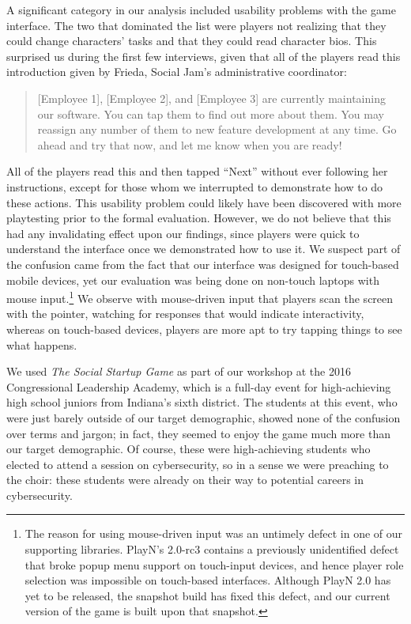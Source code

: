 \documentclass[letterpaper]{article}
\begin{document}
A significant category in our analysis included usability problems
with the game interface.
The two that dominated the list were players not realizing that they
could change characters' tasks and that they could
read character bios. This surprised us during the first few interviews,
given that all of the players read this introduction given by Frieda,
Social Jam's administrative coordinator:
\begin{quote} 
  [Employee 1], [Employee 2], and [Employee 3] are currently maintaining our
  software. You can tap them to find out more about them. You may
  reassign any number of them to new feature development at any
  time. Go ahead and try that now, and let me know when you are ready!
\end{quote}
All of the players read this and then tapped ``Next'' without ever following her
instructions, except for those whom we interrupted to demonstrate
how to do these actions.
This usability problem could likely have been discovered with 
more playtesting prior to the formal evaluation. However, we do not
believe that this had any invalidating effect upon our findings,
since players were quick to understand the interface once we
demonstrated how to use it. We suspect part of the confusion came from
the fact that our interface was designed for touch-based mobile devices,
yet our evaluation was being done on non-touch laptops with mouse
input.\footnote{The reason for using mouse-driven input was
 an untimely defect in one of our supporting libraries. 
PlayN's 2.0-rc3 contains a previously unidentified defect 
that broke popup menu support on touch-input devices, and hence player role
selection was impossible on touch-based interfaces. Although PlayN
2.0 has yet to be released, the snapshot build has fixed this defect,
and our current version of the game is built upon that snapshot.}
We observe with mouse-driven input that players scan the screen
with the pointer, watching for responses that would indicate 
interactivity, whereas on touch-based devices, players are more
apt to try tapping things to see what happens.

We used \textit{The Social Startup Game} as part of our workshop 
at the 2016 Congressional Leadership Academy, which is a full-day event
for high-achieving high school juniors from Indiana's sixth district.
The students at this event, who were just barely outside of our
target demographic, showed none of the confusion over terms
and jargon; in fact, they seemed to enjoy the game much more than our
target demographic. 
Of course, these were high-achieving students who elected
to attend a session on cybersecurity, so in a sense we were preaching
to the choir: these students were already on their way to potential
careers in cybersecurity. 
\end{document}
